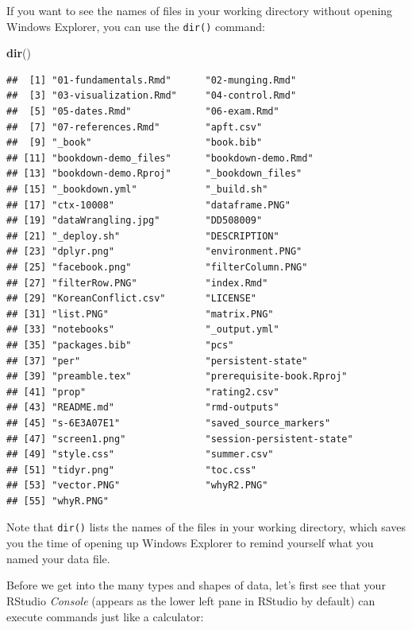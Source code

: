 \documentclass[]{book}
\newenvironment{Shaded}{\begin{snugshade}}{\end{snugshade}}
\newcommand{\KeywordTok}[1]{\textcolor[rgb]{0.13,0.29,0.53}{\textbf{{#1}}}}
\newcommand{\NormalTok}[1]{{#1}}
\begin{document}
If you want to see the names of files in your working directory without
opening Windows Explorer, you can use the \texttt{dir()} command:

\begin{Shaded}
\begin{Highlighting}[]
\KeywordTok{dir}\NormalTok{()}
\end{Highlighting}
\end{Shaded}

\begin{verbatim}
##  [1] "01-fundamentals.Rmd"      "02-munging.Rmd"          
##  [3] "03-visualization.Rmd"     "04-control.Rmd"          
##  [5] "05-dates.Rmd"             "06-exam.Rmd"             
##  [7] "07-references.Rmd"        "apft.csv"                
##  [9] "_book"                    "book.bib"                
## [11] "bookdown-demo_files"      "bookdown-demo.Rmd"       
## [13] "bookdown-demo.Rproj"      "_bookdown_files"         
## [15] "_bookdown.yml"            "_build.sh"               
## [17] "ctx-10008"                "dataframe.PNG"           
## [19] "dataWrangling.jpg"        "DD508009"                
## [21] "_deploy.sh"               "DESCRIPTION"             
## [23] "dplyr.png"                "environment.PNG"         
## [25] "facebook.png"             "filterColumn.PNG"        
## [27] "filterRow.PNG"            "index.Rmd"               
## [29] "KoreanConflict.csv"       "LICENSE"                 
## [31] "list.PNG"                 "matrix.PNG"              
## [33] "notebooks"                "_output.yml"             
## [35] "packages.bib"             "pcs"                     
## [37] "per"                      "persistent-state"        
## [39] "preamble.tex"             "prerequisite-book.Rproj" 
## [41] "prop"                     "rating2.csv"             
## [43] "README.md"                "rmd-outputs"             
## [45] "s-6E3A07E1"               "saved_source_markers"    
## [47] "screen1.png"              "session-persistent-state"
## [49] "style.css"                "summer.csv"              
## [51] "tidyr.png"                "toc.css"                 
## [53] "vector.PNG"               "whyR2.PNG"               
## [55] "whyR.PNG"
\end{verbatim}

Note that \texttt{dir()} lists the names of the files in your working
directory, which saves you the time of opening up Windows Explorer to
remind yourself what you named your data file.

Before we get into the many types and shapes of data, let's first see
that your RStudio \emph{Console} (appears as the lower left pane in
RStudio by default) can execute commands just like a calculator:
\end{document}
